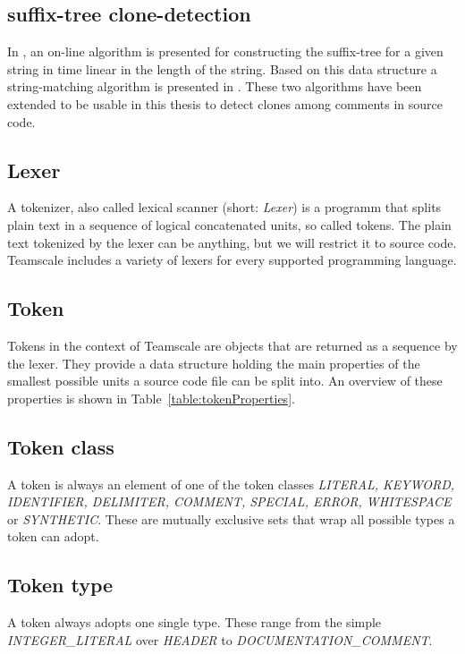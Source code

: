 \subsection{suffix-tree clone-detection}
In \cite{Ukkonen1995}, an on-line algorithm is presented for constructing the suffix-tree for a given string in time linear in the length of the string. Based on this data structure a string-matching algorithm is presented in \cite{Ukkonen1993}. These two algorithms have been extended to be usable in this thesis to detect clones among comments in source code.

\subsection{Lexer}
A tokenizer, also called lexical scanner (short: \textit{Lexer}) is a programm that splits plain text in a sequence of logical concatenated units, so called tokens. The plain text tokenized by the lexer can be anything, but we will restrict it to source code. Teamscale includes a variety of lexers for every supported programming language. 

\subsection{Token}
\label{section:token}
Tokens in the context of Teamscale are objects that are returned as a sequence by the lexer. They provide a data structure holding the main properties of the smallest possible units a source code file can be split into. An overview of these properties is shown in Table~\ref{table:tokenProperties}.


\subsection{Token class}
A token is always an element of one of the token classes \textit{LITERAL, KEYWORD, IDENTIFIER, DELIMITER, COMMENT, SPECIAL, ERROR, WHITESPACE} or \textit{SYNTHETIC}. These are mutually exclusive sets that wrap all possible types a token can adopt.

\subsection{Token type}
A token always adopts one single type. These range from the simple \textit{INTEGER\_LITERAL} over \textit{HEADER} to \textit{DOCUMENTATION\_COMMENT}.
